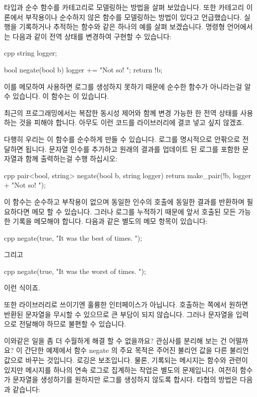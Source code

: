 
\lettrine[lhang=0.17]{타}{입과 순수 함수를 카테고리로} 모델링하는 방법을 살펴 보았습니다.
또한 카테고리 이론에서 부작용이나 순수하지 않은 함수를 모델링하는 방법이 있다고 언급했습니다.
실행을 기록하거나 추적하는 함수와 같은 하나의 예를 살펴 보겠습니다. 명령형 언어에서는 다음과
같이 전역 상태를 변경하여 구현할 수 있습니다:

\begin{snip}{cpp}
string logger;

bool negate(bool b) {
    logger += "Not so! ";
    return !b;
}
\end{snip}
이를 메모하여 사용하면 로그를 생성하지 못하기 때문에 순수한 함수가 아니라는걸 알 수 있습니다.
이 함수는 이 있습니다.

최근의 프로그래밍에서는 복잡한 동시성 제어와 함께 변경 가능한 한 전역 상태를 사용하는 것을
피해야 합니다. 아무도 이런 코드를 라이브러리에 결코 넣고 싶지 않겠죠.

다행히 우리는 이 함수를 순수하게 만들 수 있습니다. 로그를 명시적으로 안팎으로 전달하면 됩니다.
문자열 인수를 추가하고 원래의 결과를 업데이트 된 로그를 포함한 문자열과 함께 출력하는걸 수행
하십시오:

\begin{snip}{cpp}
pair<bool, string> negate(bool b, string logger) {
    return make_pair(!b, logger + "Not so! ");
}
\end{snip}
이 함수는 순수하고 부작용이 없으며 동일한 인수의 호출에 동일한 결과를 반환하며 필요하다면 메모
할 수 있습니다. 그러나 로그를 누적하기 때문에 앞서 호출된 모든 가능한 기록을 메모해야 합니다.
다음과 같은 별도의 메모 항목이 있습니다:

\begin{snip}{cpp}
negate(true, "It was the best of times. ");
\end{snip}
그리고

\begin{snip}{cpp}
negate(true, "It was the worst of times. ");
\end{snip}
이런 식이죠.

또한 라이브러리로 쓰이기엔 훌륭한 인터페이스가 아닙니다. 호출하는 쪽에서 원하면 반환된 문자열을
무시할 수 있으므로 큰 부담이 되지 않습니다. 그러나 문자열을 입력으로 전달해야 하므로 불편할 수
있습니다.

이와같은 일을 좀 더 수월하게 해결 할 수 없을까요? 관심사를 분리해 보는 건 어떨까요? 이 간단한
예제에서 함수 negate 의 주요 목적은 주어진 불리언 값을 다른 불리언 값으로 바꾸는 것입니다.
로깅은 보조입니다. 물론, 기록되는 메시지는 함수와 관련이 있지만 메시지를 하나의 연속 로그로
집계하는 작업은 별도의 문제입니다. 여전히 함수가 문자열을 생성하기를 원하지만 로그를 생성하지
않도록 합시다. 타협의 방법은 다음과 같습니다:

